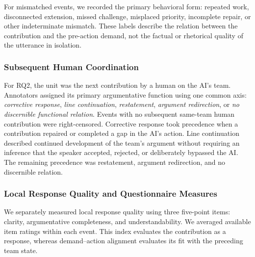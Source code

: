 \documentclass[manuscript,review,anonymous]{acmart}
\begin{document}
For mismatched events, we recorded the primary behavioral form: repeated work, disconnected extension, missed challenge, misplaced priority, incomplete repair, or other indeterminate mismatch. These labels describe the relation between the contribution and the pre-action demand, not the factual or rhetorical quality of the utterance in isolation.

\subsubsection{Subsequent Human Coordination}

For RQ2, the unit was the next contribution by a human on the AI's team. Annotators assigned its primary argumentative function using one common axis: \emph{corrective response}, \emph{line continuation}, \emph{restatement}, \emph{argument redirection}, or \emph{no discernible functional relation}. Events with no subsequent same-team human contribution were right-censored. Corrective response took precedence when a contribution repaired or completed a gap in the AI's action. Line continuation described continued development of the team's argument without requiring an inference that the speaker accepted, rejected, or deliberately bypassed the AI. The remaining precedence was restatement, argument redirection, and no discernible relation.

\subsubsection{Local Response Quality and Questionnaire Measures}

We separately measured local response quality using three five-point items: clarity, argumentative completeness, and understandability. We averaged available item ratings within each event. This index evaluates the contribution as a response, whereas demand--action alignment evaluates its fit with the preceding team state.
\end{document}

